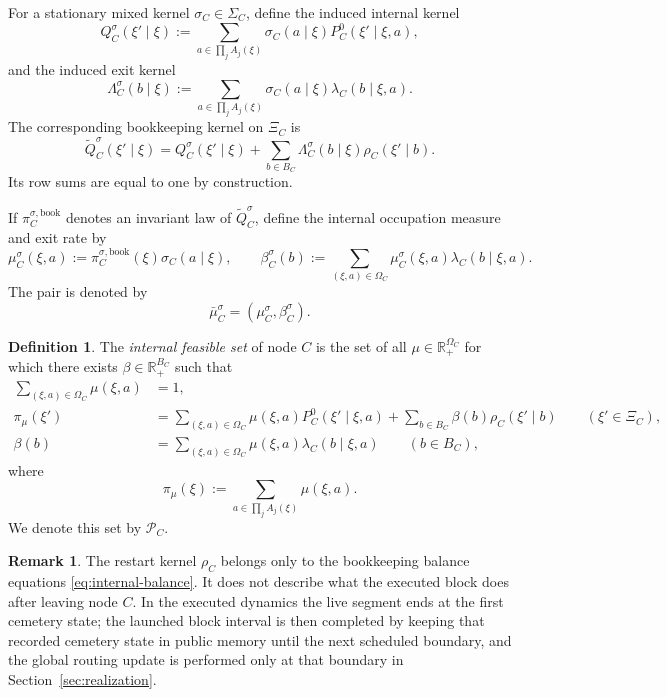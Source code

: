 \documentclass[12pt]{article}
\theoremstyle{definition}
\newtheorem{definition}[theorem]{Definition}
\newtheorem{remark}[theorem]{Remark}
\newcommand{\R}{\mathbb{R}}
\newcommand{\1}{\mathbf{1}}
\newcommand{\cP}{\mathcal{P}}
\begin{document}
For a stationary mixed kernel $\sigma_C\in\Sigma_C$, define the induced internal
kernel
\[
Q_C^{\sigma}(\xi'\mid \xi)
:=
\sum_{a\in\prod_j A_j(\xi)} \sigma_C(a\mid \xi)
P_C^0(\xi'\mid \xi,a),
\]
and the induced exit kernel
\[
\Lambda_C^{\sigma}(b\mid\xi)
:=
\sum_{a\in\prod_j A_j(\xi)}\sigma_C(a\mid\xi)\lambda_C(b\mid\xi,a).
\]
The corresponding bookkeeping kernel on $\Xi_C$ is
\begin{equation}
\label{eq:bookkeeping-kernel}
\widetilde Q_C^{\sigma}(\xi'\mid \xi)
=
Q_C^{\sigma}(\xi'\mid \xi)
+
\sum_{b\in B_C}\Lambda_C^{\sigma}(b\mid \xi)\rho_C(\xi'\mid b).
\end{equation}
Its row sums are equal to one by construction.

If $\pi_C^{\sigma,\mathrm{book}}$ denotes an invariant law of
$\widetilde Q_C^{\sigma}$, define the internal occupation measure and exit rate by
\[
\mu_C^{\sigma}(\xi,a):=\pi_C^{\sigma,\mathrm{book}}(\xi)\sigma_C(a\mid\xi),
\qquad
\beta_C^{\sigma}(b):=\sum_{(\xi,a)\in\Omega_C}
\mu_C^{\sigma}(\xi,a)\lambda_C(b\mid\xi,a).
\]
The pair is denoted by
\[
\bar\mu_C^{\sigma}=(\mu_C^{\sigma},\beta_C^{\sigma}).
\]


\begin{definition}
\label{def:PC}
The \emph{internal feasible set} of node $C$ is the set of all
$\mu\in\R_+^{\Omega_C}$ for which there exists $\beta\in\R_+^{B_C}$ such that
\begin{align}
\sum_{(\xi,a)\in\Omega_C}\mu(\xi,a)&=1,
\label{eq:norm-PC}
\\
\pi_\mu(\xi')
&=
\sum_{(\xi,a)\in\Omega_C}\mu(\xi,a)P_C^0(\xi'\mid\xi,a)
+
\sum_{b\in B_C}\beta(b)\rho_C(\xi'\mid b)
\qquad (\xi'\in\Xi_C),
\label{eq:internal-balance}
\\
\beta(b)
&=
\sum_{(\xi,a)\in\Omega_C}\mu(\xi,a)\lambda_C(b\mid\xi,a)
\qquad (b\in B_C),
\label{eq:beta-balance}
\end{align}
where
\[
\pi_\mu(\xi):=\sum_{a\in\prod_j A_j(\xi)}\mu(\xi,a).
\]
We denote this set by $\cP_C$.
\end{definition}


\begin{remark}
The restart kernel $\rho_C$ belongs only to the bookkeeping balance equations
\eqref{eq:internal-balance}. It does not describe what the executed block does
after leaving node $C$. In the executed dynamics the live segment ends at the
first cemetery state; the launched block interval is then completed by keeping
that recorded cemetery state in public memory until the next scheduled boundary,
and the global routing update is performed only at that boundary in
Section~\ref{sec:realization}.
\end{remark}
\end{document}
